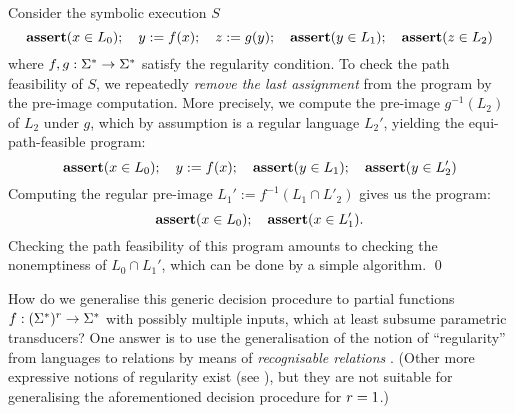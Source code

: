 \begin{example} \label{ex:unif}
    Consider the symbolic execution $S$
    \[
        \textbf{assert}(x \in L_0); \quad y := f(x); \quad z := g(y); 
        \quad \textbf{assert}(y \in L_1); \quad \textbf{assert}(z \in L_2)
    \]
    where $f, g: \Sigma^* \to \Sigma^*$ satisfy the regularity 
    condition. To check the path feasibility of $S$, we repeatedly \emph{remove the last
    assignment} from the program by the pre-image computation. More
    precisely, we compute the pre-image $g^{-1}(L_2)$
    of $L_2$ under $g$, which by assumption is a regular language $L_2'$,
    yielding the equi-path-feasible program:
    \[
        \textbf{assert}(x \in L_0); \quad y := f(x); \quad \textbf{assert}(y \in L_1); \quad  \textbf{assert}(y \in L_2') 
    \]
    Computing the regular pre-image $L_1' := f^{-1}(L_1 \cap L'_2)$ gives us
    the program:
    \[
        \textbf{assert}(x \in L_0); \quad \textbf{assert}(x \in L_1').
    \]
%
    Checking the path feasibility of this program amounts to checking the nonemptiness of
    $L_0 \cap L_1'$, which can be done by a simple \FA{} algorithm.
    \qed
\end{example}
How do we generalise this generic decision procedure to partial functions $f: 
(\Sigma^*)^r \to \Sigma^*$ with possibly multiple inputs, which at least
subsume parametric transducers? 
One answer is to use the generalisation of
the notion of ``regularity'' from languages to relations 
by means of \emph{recognisable relations} \cite{choffrut-survey}.
(Other more expressive notions of regularity exist (see \cite{choffrut-survey}),
but they are not suitable for generalising the aforementioned decision
procedure for $r=1$.)
%

